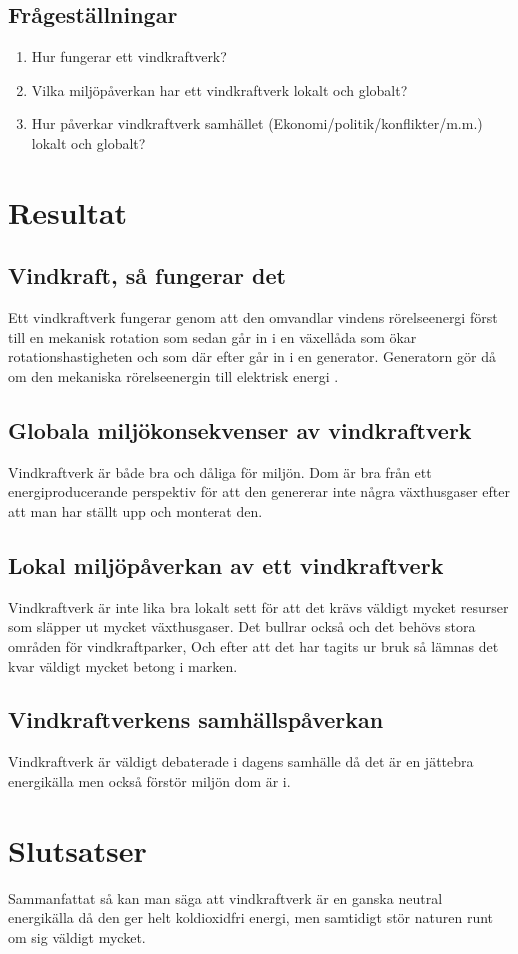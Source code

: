 \documentclass[11p]{article}
\begin{document}
    \subsection{Frågeställningar}
    \begin{enumerate}
        \item Hur fungerar ett vindkraftverk?
        \item Vilka miljöpåverkan har ett vindkraftverk lokalt och globalt?
        \item Hur påverkar vindkraftverk samhället (Ekonomi/politik/konflikter/m.m.) lokalt och globalt?
    \end{enumerate}

    \section{Resultat}

    \subsection{Vindkraft, så fungerar det}
    Ett vindkraftverk fungerar genom att den omvandlar vindens rörelseenergi först till en mekanisk
    rotation som sedan går in i en växellåda som ökar rotationshastigheten och som där efter går in i en generator.
    Generatorn gör då om den mekaniska rörelseenergin till elektrisk energi \parencite[sid 267]{Fraenkel}.

    \subsection{Globala miljökonsekvenser av vindkraftverk}
    Vindkraftverk är både bra och dåliga för miljön. Dom är bra från ett energiproducerande perspektiv
    för att den genererar inte några växthusgaser efter att man har ställt upp och monterat den.

    \subsection{Lokal miljöpåverkan av ett vindkraftverk}
    Vindkraftverk är inte lika bra lokalt sett för att det krävs väldigt mycket resurser som släpper ut mycket växthusgaser.
    Det bullrar också och det behövs stora områden för vindkraftparker, Och efter att det har tagits ur bruk så lämnas det kvar väldigt mycket betong i marken.

    \subsection{Vindkraftverkens samhällspåverkan}
    Vindkraftverk är väldigt debaterade i dagens samhälle då det är en jättebra energikälla men också förstör miljön dom är i.

    \section{Slutsatser}
    Sammanfattat så kan man säga att vindkraftverk är en ganska neutral energikälla då den ger helt koldioxidfri energi,
    men samtidigt stör naturen runt om sig väldigt mycket.
    \printbibliography
\end{document}
